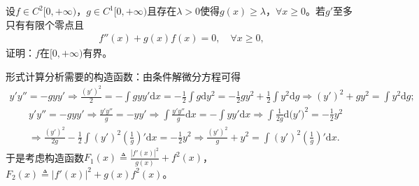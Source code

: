 \documentclass[../../main.tex]{subfiles}%
\begin{document}
\begin{example}
设\(f \in C^{2}[0, +\infty)\)，\(g \in C^{1}[0, +\infty)\)且存在\(\lambda > 0\)使得\(g(x) \geqslant \lambda\)，\(\forall x \geqslant 0\)。若\(g'\)至多只有有限个零点且
\begin{align*}
f''(x)+g(x)f(x) = 0,\quad\forall x \geqslant 0,
\end{align*}
证明：\(f\)在\([0, +\infty)\)有界。
\end{example}
\begin{note}
形式计算分析需要的构造函数：由条件解微分方程可得
\begin{align*}
y' y'' =-gyy' \Longrightarrow \frac{(y' )^2}{2}=-\int{gyy' \mathrm{d}x}=-\frac{1}{2}\int{g\mathrm{d}y^2}=-\frac{1}{2}gy^2+\frac{1}{2}\int{y^2\mathrm{d}g}\Longrightarrow (y' )^2+gy^2=\int{y^2\mathrm{d}g};
\end{align*}
\begin{align*}
&y' y'' =-gyy' \Longrightarrow \frac{y' y''}{g}=-yy' \Longrightarrow \int{\frac{y' y''}{g}\mathrm{d}x}=-\int{yy' \mathrm{d}x}\Longrightarrow \int{\frac{1}{2g}\mathrm{d(}y' )^2}=-\frac{1}{2}y^2
\\
&\Longrightarrow \frac{(y' )^2}{2g}-\frac{1}{2}\int{(y' )^2\left( \frac{1}{g} \right) ' \mathrm{d}x}=-\frac{1}{2}y^2\Longrightarrow \frac{(y' )^2}{g}+y^2=\int{(y' )^2\left( \frac{1}{g} \right) ' \mathrm{d}x}.
\end{align*}
于是考虑构造函数\(F_1( x ) \triangleq \frac{| f'( x ) |^2}{g( x )}+f^2( x )\)，\(F_2( x ) \triangleq | f'( x ) |^2+g( x ) f^2( x )\)。
\end{note}
\end{document}
